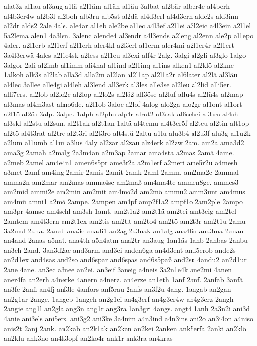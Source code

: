 {alat3z
al1au
al3aug
a1lä
a2l1äm
al1än
al1äu
3albat
al2bär
alber4e
al4berh
al4b3er4w
al2b3l
al2boh
alb3ru
alb5st
al2dä
al4d3erl
al4d3ern
alde2s
ald3inn
al2dr
alds2
2ale
4ale.
ale4ar
al1eb
ale2be
al1ec
a4l3ef
a2l1ei
a3l2eic
a4l3ein
a2l1el
5a2lema
alen1
4a3len.
3alenc
alende4
al3endr
a4l3ends
a2leng
al2enn
ale2p
al1epo
4aler.
a2l1erb
a2l1erf
a2l1erh
aler4kl
a2l3erl
al1erm
aler4mi
a2l1er4r
a2l1ert
3a4l3erwä
4ales
a2l1e4sk
a2less
a2l1eu
al3exi
alf4r
2alg.
3algi
al2gli
al3glo
1algo
3algor
2ali
al2imb
al1imm
ali4nal
al1ind
a2l1inq
al1ins
alken1
al2klö
al2kne
1alkoh
alk3s
al2lab
alla3d
alla2m
al2lan
al2l1ap
al2l1a2r
al6later
al2lä
al3läu
al4lec
3allee
alle4gi
al4leh
al3lend
all3erk
al3les
alle3se
al2leu
al2lid
alli5er.
alli7ers.
al2lob
al2lo2c
al2lop
al2lo2s
al2lö2
all3öse
al2luf
allu4s
al2lü4s
al2map
al3mas
al4m3ast
almo6de.
a2l1ob
3aloe
a2lof
4alog
alo2ga
alo2gr
al1ont
al1ort
a2l1ö
al2ös
3alp.
3alpe.
1alph
al2pho
alp4r
alrat2
al3sak
al6schei
al3ses
al4sh
al3skl
al2stu
al2sum
al2t1ak
al2t1an
1altä
al4temu
al4t3er5f
al2teu
al2tin
alt1op
al2tö
al4t3rat
al2tre
al2t3ri
al2t3ro
alt4stü
2altu
a1lu
alu3b4
al2u3f
alu3g
al1u2k
a2lum
al1umb
al1ur
a3lus
4aly
al2zar
al2zau
alz4erk
al2zw
2am.
am2a
ama3d2
ama3g
2amah
a2malg
2a3m4an
a2m3ap
2amar
ama4sta
a2maz
2amä
4ame.
a2meb
2amel
am4e4n1
amen6s5pr
ame3r2a
a2m1erf
a2meri
ame5r2u
a4mesh
a3met
2amf
am4ing
2amir
2amis
2amit
2amk
2aml
2amm.
am2ma2c
2ammal
amma2n
am2mar
am2mas
amma4sc
am2maß
am4ma4te
ammen8ge.
ammes3
am2mid
ammi2e
am2min
am2mit
am4mo2d
am2mö
ammu2
amm3unt
am4mus
am4mü
amni1
a2mö
2ampe.
2ampen
am4pf
amp2f1a2
ampf1o
2am2ple
2ampo
am3pr
4amsc
am4schl
am3sh
1amt.
am2t1a2
am2t1ä
am2tei
amt3eig
am2tel
2amtem
am4t3ern
am2t1ex
am2tis
am2tit
am2to4
am2tö
am2t3r
am2t1u
2amu
3a2mul
2ana.
2anab
ana3c
anadi1
an2ag
2a3nak
an1alg
ana4lin
ana3ma
2anan
an4and
2anas
a5nat.
ana4th
a5n4atm
ana2tr
an3aug
1an1äs
1anb
2anbas
2anbu
an3ch
2and.
3an3d2ac
and3arm
and3ei
anden6ga
an4d3ent
and5erob
ande2s
an2d1ex
and4sas
and2so
and6spar
and6spas
and6s5paß
and2su
4andu2
an2d1ur
2ane
4ane.
an3ec
a3nee
an2ei.
an3eif
3aneig
a4neis
3a2n1e4k
ane2mi
4anen
aner4fa
an2erh
a4nerke
4anern
a4nerz.
an4erze
an1eth
1anf
2anf.
2anfab
3anfä
an3fe
2anfi
an4fj
anf3le
4anfors
anf5rau
2anfs
an3f2u
4ang.
1angab
an2gan
an2g1ar
2ange.
1angeb
1angeh
an2g1ei
an4g3erf
an4g3er4w
an4g3erz
2angh
2angie
ang1l
an2gla
ang3n
ang1r
ang3ra
1an3gri
4angs.
angt4
1anh
2a3n2i
ani3d
4anie
ani3els
ani5ers.
ani3g2
ani3ke
3a4nim
a4n3ind
a4n3ins
ani2o
an3i4on
a4niso
anis2t
2anj
2ank.
an2kab
an2k1ak
an2kan
an2kei
2anken
ank5erfa
2anki
an2klö
an2klu
ank3no
an4k3opf
an2ko4r
ank1r
ank3ra
an4kras
}
